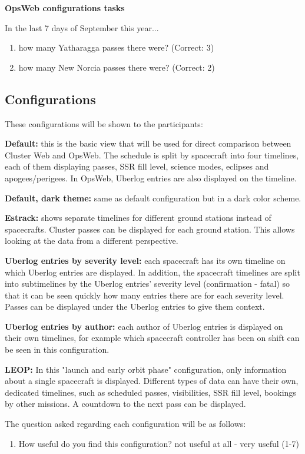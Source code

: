 \textbf{OpsWeb configurations tasks}


In the last 7 days of September this year...
\begin{enumerate}
\item how many Yatharagga passes there were? (Correct: 3)
\item how many New Norcia passes there were? (Correct: 2)
\end{enumerate}

\subsection{Configurations} \label{configurations_section}
These configurations will be shown to the participants:

\textbf{Default:} this is the basic view that will be used for direct comparison between Cluster Web and OpsWeb. The schedule is split by spacecraft into four timelines, each of them displaying passes, SSR fill level, science modes, eclipses and apogees/perigees. In OpsWeb, Uberlog entries are also displayed on the timeline.

\textbf{Default, dark theme:} same as default configuration but in a dark color scheme.

\textbf{Estrack:} shows separate timelines for different ground stations instead of spacecrafts. Cluster passes can be displayed for each ground station. This allows looking at the data from a different perspective.

\textbf{Uberlog entries by severity level:} each spacecraft has its own timeline on which Uberlog entries are displayed. In addition, the spacecraft timelines are split into subtimelines by the Uberlog entries' severity level (confirmation - fatal) so that it can be seen quickly how many entries there are for each severity level. Passes can be displayed under the Uberlog entries to give them context.

\textbf{Uberlog entries by author:} each author of Uberlog entries is displayed on their own timelines, for example which spacecraft controller has been on shift can be seen in this configuration.

\textbf{LEOP:} In this "launch and early orbit phase" configuration, only information about a single spacecraft is displayed. Different types of data can have their own, dedicated timelines, such as scheduled passes, visibilities, SSR fill level, bookings by other missions. A countdown to the next pass can be displayed.

The question asked regarding each configuration will be as follows:
\begin{enumerate}
\item How useful do you find this configuration? not useful at all - very useful (1-7)
\end{enumerate}

